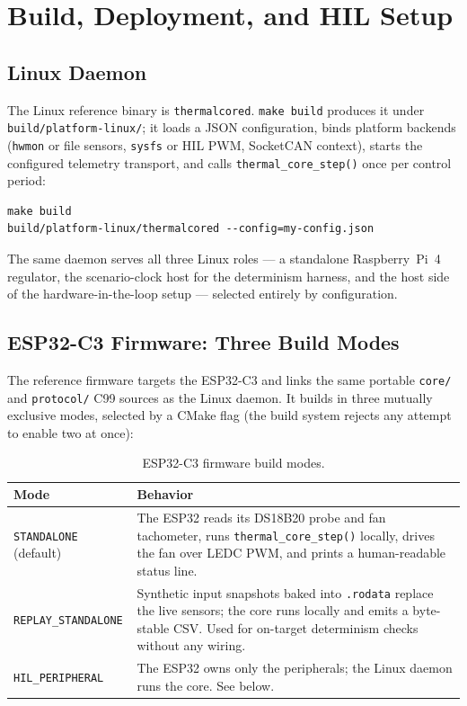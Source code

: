 \section{Build, Deployment, and HIL Setup}\label{sec:deployment}

\subsection{Linux Daemon}

The Linux reference binary is \texttt{thermalcored}. \texttt{make build} produces it under \texttt{build/platform-linux/}; it loads a JSON configuration, binds platform backends (\texttt{hwmon} or file sensors, \texttt{sysfs} or HIL PWM, SocketCAN context), starts the configured telemetry transport, and calls \texttt{thermal\_core\_step()} once per control period:

\begin{lstlisting}[caption={Running the Linux daemon}]
make build
build/platform-linux/thermalcored --config=my-config.json
\end{lstlisting}

The same daemon serves all three Linux roles --- a standalone Raspberry~Pi~4 regulator, the scenario-clock host for the determinism harness, and the host side of the hardware-in-the-loop setup --- selected entirely by configuration.

\subsection{ESP32-C3 Firmware: Three Build Modes}

The reference firmware targets the ESP32-C3 and links the same portable \texttt{core/} and \texttt{protocol/} C99 sources as the Linux daemon. It builds in three mutually exclusive modes, selected by a CMake flag (the build system rejects any attempt to enable two at once):

\begin{table}[h]
\centering
\begin{tabular}{p{}p{}}
\toprule
\textbf{Mode} & \textbf{Behavior} \\
\midrule
\texttt{STANDALONE} (default) & The ESP32 reads its DS18B20 probe and fan tachometer, runs \texttt{thermal\_core\_step()} locally, drives the fan over LEDC PWM, and prints a human-readable status line. \\
\texttt{REPLAY\_STANDALONE} & Synthetic input snapshots baked into \texttt{.rodata} replace the live sensors; the core runs locally and emits a byte-stable CSV. Used for on-target determinism checks without any wiring. \\
\texttt{HIL\_PERIPHERAL} & The ESP32 owns only the peripherals; the Linux daemon runs the core. See below. \\
\bottomrule
\end{tabular}
\caption{ESP32-C3 firmware build modes.}
\label{tab:esp32-modes}
\end{table}

